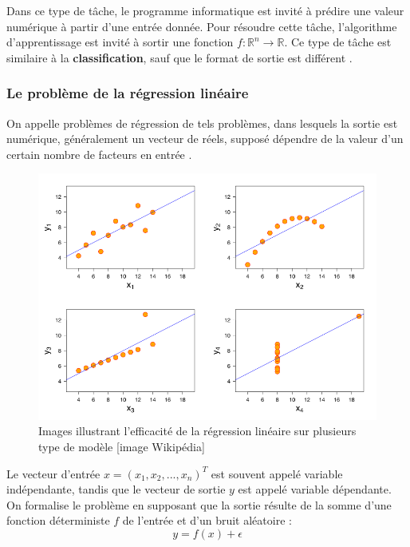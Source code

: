 	Dans ce type de tâche, le programme informatique est invité à prédire une valeur numérique à partir d'une entrée donnée. Pour résoudre cette tâche, l'algorithme d'apprentissage est invité à sortir une fonction $f : \mathbb{R}^n \rightarrow \mathbb{R}$. Ce type de tâche est similaire à la \textbf{classification}, sauf que le format de sortie est différent \cite{goodfellow2016deep}.
	
	
	
	
	\subsubsection{Le problème de la régression linéaire}
		On appelle problèmes de régression de tels problèmes, dans lesquels la sortie est numérique, généralement un vecteur de réels, supposé dépendre de la valeur d'un certain nombre de facteurs en entrée \cite{matloff2017statistical}.
		
		\begin{figure}[hth]%
			\centering
			\includegraphics[width=\textwidth]{images/linear_regression_quartet.png}
			\caption{Images illustrant l'efficacité de la régression linéaire sur plusieurs type de modèle [image Wikipédia]
			}
			\label{fig:linear_regression_quartet}
		\end{figure}
		
		Le vecteur d'entrée $x = (x_1,x_2,...,x_n)^T$ est souvent appelé variable indépendante, tandis que le vecteur de sortie $y$ est appelé variable dépendante. On formalise le problème en supposant que la sortie résulte de la somme d'une fonction déterministe $f$ de l'entrée et d'un bruit aléatoire :
		\begin{equation}
			y = f(x) + \epsilon
		\end{equation}
	
